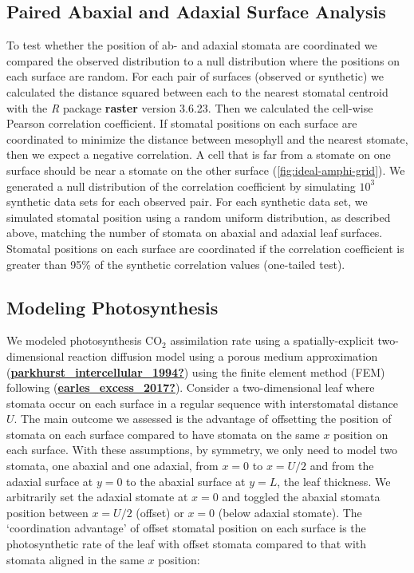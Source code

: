 \documentclass[12pt,halfline,a4paper,]{ouparticle}
\begin{document}
\hypertarget{paired-abaxial-and-adaxial-surface-analysis}{%
\subsection{Paired Abaxial and Adaxial Surface
Analysis}\label{paired-abaxial-and-adaxial-surface-analysis}}

To test whether the position of ab- and adaxial stomata are coordinated
we compared the observed distribution to a null distribution where the
positions on each surface are random. For each pair of surfaces
(observed or synthetic) we calculated the distance squared between each
to the nearest stomatal centroid with the \emph{R} package
\textbf{raster} version 3.6.23. Then we calculated the cell-wise Pearson
correlation coefficient. If stomatal positions on each surface are
coordinated to minimize the distance between mesophyll and the nearest
stomate, then we expect a negative correlation. A cell that is far from
a stomate on one surface should be near a stomate on the other surface
(\autoref{fig:ideal-amphi-grid}). We generated a null distribution of
the correlation coefficient by simulating \(10^3\) synthetic data sets
for each observed pair. For each synthetic data set, we simulated
stomatal position using a random uniform distribution, as described
above, matching the number of stomata on abaxial and adaxial leaf
surfaces. Stomatal positions on each surface are coordinated if the
correlation coefficient is greater than 95\% of the synthetic
correlation values (one-tailed test).

\hypertarget{modeling-photosynthesis}{%
\subsection{Modeling Photosynthesis}\label{modeling-photosynthesis}}

We modeled photosynthesis CO\(_2\) assimilation rate using a
spatially-explicit two-dimensional reaction diffusion model using a
porous medium approximation
(\protect\hyperlink{ref-parkhurst_intercellular_1994}{\textbf{parkhurst\_intercellular\_1994?}})
using the finite element method (FEM) following
(\protect\hyperlink{ref-earles_excess_2017}{\textbf{earles\_excess\_2017?}}).
Consider a two-dimensional leaf where stomata occur on each surface in a
regular sequence with interstomatal distance \(U\). The main outcome we
assessed is the advantage of offsetting the position of stomata on each
surface compared to have stomata on the same \(x\) position on each
surface. With these assumptions, by symmetry, we only need to model two
stomata, one abaxial and one adaxial, from \(x = 0\) to \(x = U/2\) and
from the adaxial surface at \(y = 0\) to the abaxial surface at
\(y = L\), the leaf thickness. We arbitrarily set the adaxial stomate at
\(x = 0\) and toggled the abaxial stomata position between \(x = U/2\)
(offset) or \(x = 0\) (below adaxial stomate). The `coordination
advantage' of offset stomatal position on each surface is the
photosynthetic rate of the leaf with offset stomata compared to that
with stomata aligned in the same \(x\) position:
\end{document}

